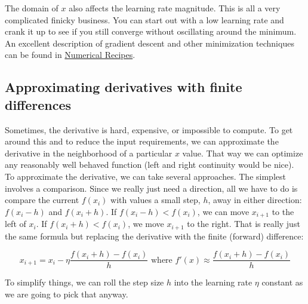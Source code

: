 \begin{fullwidth}

The domain of $x$ also affects the learning rate magnitude. This is all a very complicated finicky business. You can start out with a low learning rate and crank it up to see if you still converge without oscillating around the minimum.  \noindent An excellent description of gradient descent and other minimization techniques can be found in \href{http://apps.nrbook.com/fortran/index.html}{Numerical Recipes}.

\subsection{Approximating derivatives with finite differences}

Sometimes, the derivative is hard, expensive, or impossible to compute.  To get around this and to reduce the input requirements, we can approximate the derivative in the neighborhood of a particular $x$ value. That way we can optimize any reasonably well behaved function (left and right continuity would be nice). To approximate the derivative, we can take several approaches. The simplest involves a comparison. Since we really just need a direction, all we have to do is compare the current $f(x_i)$ with values a small step, $h$, away in either direction: $f(x_{i}-h)$ and $f(x_{i}+h)$.  If $f(x_{i}-h) < f(x_{i})$, we can move $x_{i+1}$ to the left of $x_{i}$. If $f(x_{i}+h) < f(x_{i})$, we move $x_{i+1}$ to the right.  That is really just the same formula but replacing the derivative with the finite (forward) difference:

\[
x _{i+1} = x_i - \eta \frac{f(x_{i}+h) - f(x_{i})}{h} \text{ where } f'(x) \approx \frac{f(x_{i}+h) - f(x_{i})}{h}
\]

\noindent To simplify things, we can roll the step size $h$ into the learning rate $\eta$ constant as we are going to pick that anyway.


\end{fullwidth}
